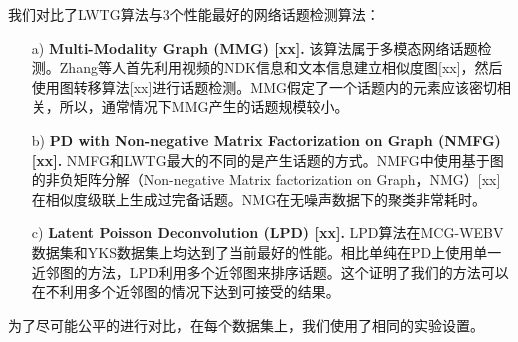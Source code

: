 我们对比了LWTG算法与3个性能最好的网络话题检测算法：
\begin{enumerate}
  \item[a)] \textbf{Multi-Modality Graph (MMG) [xx].} 该算法属于多模态网络话题检测。Zhang等人首先利用视频的NDK信息和文本信息建立相似度图[xx]，然后使用图转移算法[xx]进行话题检测。MMG假定了一个话题内的元素应该密切相关，所以，通常情况下MMG产生的话题规模较小。
  \item[b)] \textbf{PD with Non-negative Matrix Factorization on Graph
(NMFG) [xx].} NMFG和LWTG最大的不同的是产生话题的方式。NMFG中使用基于图的非负矩阵分解（Non-negative Matrix factorization on Graph，NMG）[xx]在相似度级联上生成过完备话题。NMG在无噪声数据下的聚类非常耗时。
  \item[c)] \textbf{Latent Poisson Deconvolution (LPD) [xx].} LPD算法在MCG-WEBV数据集和YKS数据集上均达到了当前最好的性能。相比单纯在PD上使用单一近邻图的方法，LPD利用多个近邻图来排序话题。这个证明了我们的方法可以在不利用多个近邻图的情况下达到可接受的结果。
\end{enumerate}
为了尽可能公平的进行对比，在每个数据集上，我们使用了相同的实验设置。
